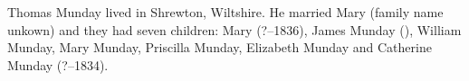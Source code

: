 
Thomas Munday lived in Shrewton, Wiltshire.  He married Mary (family name unkown) and they had seven children: Mary (?--1836), James Munday (), William Munday, Mary Munday, Priscilla Munday, Elizabeth Munday and
Catherine Munday (?--1834). 

